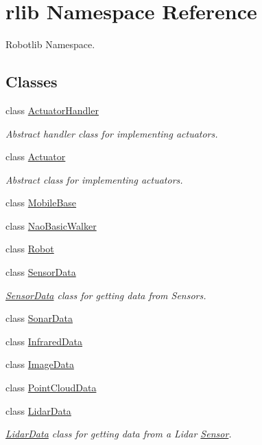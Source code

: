 \hypertarget{namespacerlib}{\section{rlib Namespace Reference}
\label{namespacerlib}
}


Robotlib Namespace.  


\subsection*{Classes}
\begin{DoxyCompactItemize}
\item 
class \hyperlink{classrlib_1_1ActuatorHandler}{Actuator\-Handler}
\begin{DoxyCompactList}\small\item\em Abstract handler class for implementing actuators. \end{DoxyCompactList}\item 
class \hyperlink{classrlib_1_1Actuator}{Actuator}
\begin{DoxyCompactList}\small\item\em Abstract class for implementing actuators. \end{DoxyCompactList}\item 
class \hyperlink{classrlib_1_1MobileBase}{Mobile\-Base}
\item 
class \hyperlink{classrlib_1_1NaoBasicWalker}{Nao\-Basic\-Walker}
\item 
class \hyperlink{classrlib_1_1Robot}{Robot}
\item 
class \hyperlink{classrlib_1_1SensorData}{Sensor\-Data}
\begin{DoxyCompactList}\small\item\em \hyperlink{classrlib_1_1SensorData}{Sensor\-Data} class for getting data from Sensors. \end{DoxyCompactList}\item 
class \hyperlink{classrlib_1_1SonarData}{Sonar\-Data}
\item 
class \hyperlink{classrlib_1_1InfraredData}{Infrared\-Data}
\item 
class \hyperlink{classrlib_1_1ImageData}{Image\-Data}
\item 
class \hyperlink{classrlib_1_1PointCloudData}{Point\-Cloud\-Data}
\item 
class \hyperlink{classrlib_1_1LidarData}{Lidar\-Data}
\begin{DoxyCompactList}\small\item\em \hyperlink{classrlib_1_1LidarData}{Lidar\-Data} class for getting data from a Lidar \hyperlink{classrlib_1_1Sensor}{Sensor}. \end{DoxyCompactList}\item 

\end{DoxyCompactItemize}
